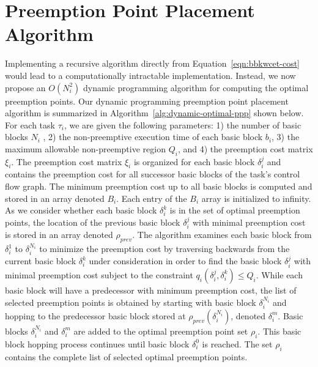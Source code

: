 \vspace{-5pt}
\section{Preemption Point Placement Algorithm}\label{sec:implementation}

 Implementing a recursive algorithm directly from Equation~\ref{eqn:bbkwcet-cost} would lead to a computationally intractable implementation.  Instead, we now propose an \begin{math}O(N_i^{2})\end{math} dynamic programming algorithm for computing the optimal preemption points.  Our dynamic programming preemption point placement algorithm is summarized in Algorithm~\ref{alg:dynamic-optimal-ppp} shown below.  For each task $\tau_i$, we are given the following parameters: 1) the number of basic blocks $N_i$ , 2) the non-preemptive execution time of each basic block $b_i$, 3) the maximum allowable non-preemptive region $Q_i$, and 4) the preemption cost matrix $\xi_i$.  The preemption cost matrix $\xi_i$ is organized for each basic block \begin{math}\delta_{i}^{j}\end{math} and contains the preemption cost for all successor basic blocks of the task's control flow graph.  The minimum preemption cost up to all basic blocks is computed and stored in an array denoted $B_{i}$.  Each entry of the $B_i$ array is initialized to infinity.
 As we consider whether each basic block $\delta_{i}^{k}$ is in the set of optimal preemption points, the location of the previous basic block $\delta_{i}^{j}$ with minimal preemption cost is stored in an array denoted $\rho_{prev}$.  The algorithm examines each basic block from \begin{math}\delta_{i}^{1}\end{math} to \begin{math}\delta_{i}^{N_i}\end{math} to minimize the preemption cost by traversing backwards from the current basic block $\delta_{i}^{k}$ under consideration in order to find the basic block $\delta_{i}^{j}$ with minimal preemption cost subject to the constraint $q_{i}(\delta_{i}^{j},\delta_{i}^{k}) \leq Q_{i}$.  While each basic block will have a predecessor with minimum preemption cost, the list of selected preemption points is obtained by starting with basic block $\delta_{i}^{N_i}$ and hopping to the predecessor basic block stored at $\rho_{prev}(\delta_{i}^{N_i})$, denoted $\delta_{i}^{m}$.  Basic blocks $\delta_{i}^{N_i}$ and $\delta_{i}^{m}$ are added to the optimal preemption point set $\rho_{i}$.  This basic block hopping process continues until basic block $\delta_{i}^{0}$ is reached.  The set $\rho_{i}$ contains the complete list of selected optimal preemption points. 
